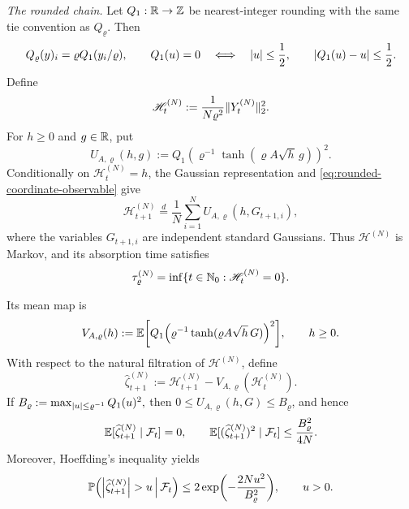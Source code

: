 \documentclass[11pt,reqno,a4paper]{article}
\newcommand{\Pp}{\P}
\newcommand{\Ee}{\E}
\begin{document}
\emph{The rounded chain.}
Let $Q_1:\mathbb{R}\to\mathbb{Z}$ be nearest-integer rounding with the same tie convention as
$Q_\varrho$. Then
\begin{equation*}
  Q_\varrho(y)_i=\varrho Q_1(y_i/\varrho),
  \qquad
  Q_1(u)=0 \quad\Longleftrightarrow\quad \abs u\leq\frac12,
  \qquad
  \abs{Q_1(u)-u}\leq\frac12.
\end{equation*}
Define
\begin{equation}\label{eq:subcritical-exact-grid-radius}
  \mathscr H_t^{(N)}
  :=
  \frac1{N\varrho^2}\lVert Y_t^{(N)}\rVert_2^2 .
\end{equation}
For $h\geq0$ and $g\in\mathbb{R}$, put
\begin{equation}\label{eq:rounded-coordinate-observable}
  U_{A,\varrho}(h,g)
  :=
  Q_1\left(
    \varrho^{-1}\tanh(\varrho A\sqrt h\,g)
  \right)^2.
\end{equation}
Conditionally on $\mathscr H_t^{(N)}=h$, the Gaussian representation and
\cref{eq:rounded-coordinate-observable} give
\begin{equation}\label{eq:subcritical-exact-grid-transition}
  \mathscr H_{t+1}^{(N)}
  \stackrel{d}{=}
  \frac1N\sum_{i=1}^N U_{A,\varrho}(h,G_{t+1,i}),
\end{equation}
where the variables $G_{t+1,i}$ are independent standard Gaussians. Thus
$\mathscr H^{(N)}$ is Markov, and its absorption time satisfies
\begin{equation}\label{eq:subcritical-exact-absorption}
  \tau_\varrho^{(N)}
  =
  \inf\{t\in\mathbb{N}_0:\mathscr H_t^{(N)}=0\}.
\end{equation}

Its mean map is
\begin{equation}\label{eq:rounded-radius-map}
  V_{A,\varrho}(h)
  :=
  \Ee\left[
    Q_1\left(
      \varrho^{-1}\tanh(\varrho A\sqrt h\,G)
    \right)^2
  \right],
  \qquad h\geq0.
\end{equation}
With respect to the natural filtration of $\mathscr H^{(N)}$, define
\begin{equation}\label{eq:rounded-noise-decomposition}
  \widehat\zeta_{t+1}^{(N)}
  :=
  \mathscr H_{t+1}^{(N)}
  -V_{A,\varrho}(\mathscr H_t^{(N)}).
\end{equation}
If
$
  B_\varrho
  :=
  \max_{\abs u\leq\varrho^{-1}}Q_1(u)^2,
$
then $0\leq U_{A,\varrho}(h,G)\leq B_\varrho$, and hence
\begin{equation}\label{eq:rounded-noise-moments}
  \Ee[\widehat\zeta_{t+1}^{(N)}\mid\mathcal F_t]=0,
  \qquad
  \Ee[(\widehat\zeta_{t+1}^{(N)})^2\mid\mathcal F_t]
  \leq
  \frac{B_\varrho^2}{4N}.
\end{equation}
Moreover, Hoeffding's inequality yields
\begin{equation}\label{eq:rounded-noise-hoeffding}
  \Pp\left(
    \abs{\widehat\zeta_{t+1}^{(N)}}>u
    \,\middle|\,\mathcal F_t
  \right)
  \leq
  2\exp\left(-\frac{2Nu^2}{B_\varrho^2}\right),
  \qquad u>0.
\end{equation}
\end{document}
